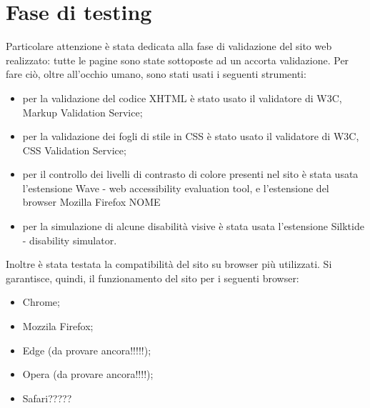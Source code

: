\section{Fase di testing}
Particolare attenzione è stata dedicata alla fase di validazione del sito web realizzato: tutte le pagine sono state sottoposte ad un accorta validazione. Per fare ciò, oltre all'occhio umano, sono stati usati i seguenti strumenti: 
\begin{itemize}
	\item per la validazione del codice XHTML è stato usato il validatore di W3C, Markup Validation Service;
	\item per la validazione dei fogli di stile in CSS è stato usato il validatore di W3C, CSS Validation Service;
	\item per il controllo dei livelli di contrasto di colore presenti nel sito è stata usata l'estensione Wave - web accessibility evaluation tool, e l'estensione del browser Mozilla Firefox NOME
	\item per la simulazione di alcune disabilità visive è stata usata l'estensione Silktide - disability simulator.
\end{itemize}
Inoltre è stata testata la compatibilità del sito su browser più utilizzati. Si garantisce, quindi, il funzionamento del sito per i seguenti browser:
\begin{itemize}
\item Chrome;
\item Mozzila Firefox;
\item Edge (da provare ancora!!!!!);
\item Opera (da provare ancora!!!!);
\item Safari?????
\end{itemize}